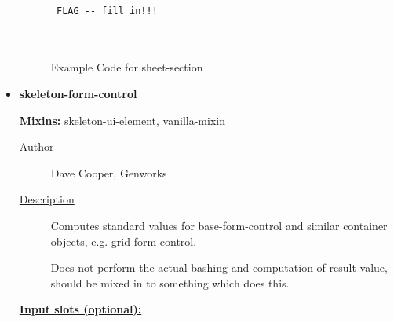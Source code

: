 \documentclass [11pt]{book}
\begin{document}
\begin{itemize}
\begin{description}
\end{description}




\begin{figure}
\begin{lrbox}{\boxedverb}
\begin{minipage}{\linewidth}
{\small

\begin{verbatim}

 FLAG -- fill in!!!



\end{verbatim}}
\end{minipage}
\end{lrbox}
\fbox{\usebox{\boxedverb}}

\caption{Example Code for sheet-section}

\label{fig:example-code-sheet-section}

\end{figure}






\item {}
\label{prim:skeleton-form-control}
\textbf{skeleton-form-control}


\textbf{
\underline{Mixins:}} skeleton-ui-element, vanilla-mixin





\begin{description}

\item [
\underline{Author}]


Dave Cooper, Genworks



\item [
\underline{Description}]


Computes standard values for base-form-control and similar container objects, e.g. grid-form-control.

Does not perform the actual bashing and computation of result value, should be mixed in to something which does this.



\end{description}








\textbf{
\underline{Input slots (optional):}}


\end{itemize}
\end{document}
